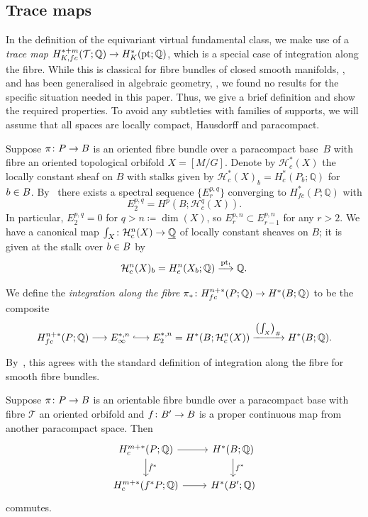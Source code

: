 \documentclass[AHL,Unicode,longabstracts]{cedram}
\newcommand{\sub}{\subset}
\newcommand{\cl}{\colon}
\newcommand{\lc}{\underline}
\newcommand{\bQ}{\mathbb{Q}}
\newcommand{\cH}{\mathcal{H}}
\newcommand{\cT}{\mathcal{T}}
\DeclareMathOperator{\Pt}{pt}
\newcommand{\xra}{\xrightarrow}
\renewcommand*{\to}{\mathchoice{\longrightarrow}{\rightarrow}{\rightarrow}{\rightarrow}}
\newcommand{\longhookrightarrow}{\lhook\joinrel\longrightarrow}
\newcommand*{\hookto}{\mathchoice{\longhookrightarrow}{\hookrightarrow}{\hookrightarrow}{\hookrightarrow}}
\let\oldin\in
\renewcommand{\in}{\mathchoice{\oldin}{\oldin}{\,\oldin\,}{\,\oldin\,}}
\let\oldtilde\tilde
\renewcommand*{\tilde}[1]{\mathchoice{\widetilde{#1}}{\widetilde{#1}}{\oldtilde{#1}}{\oldtilde{#1}}}
\begin{document}
\subsection{Trace maps}\label{subsec:trace}
In the definition of the equivariant virtual fundamental class, we make use of a \emph{trace map} $H^{*+m}_{K,fc}(\cT;\bQ)\to H^*_K(\Pt;\bQ)$, which is a special case of integration along the fibre. While this is classical for fibre bundles of closed smooth manifolds, \cite{BT82}, and has been generalised in algebraic geometry, \cite{Iv86,KS94}, we found no results for the specific situation needed in this paper. Thus, we give a brief definition and show the required properties. To avoid any subtleties with families of supports, we will assume that all spaces are locally compact, Hausdorff and paracompact.

\begin{defi} Suppose $\pi \cl P \to B$ is an oriented fibre bundle over a paracompact base~$B$ with fibre an oriented topological orbifold $X = [M/G]$. Denote by $\cH^*_c(X)$ the locally constant sheaf on $B$ with stalks given by $\cH^*_c(X)_b = H^*_c(P_b;\bQ)$ for $b \in B$. By~\cite[Theorem~6.1]{Bre12} there exists a spectral sequence $\{E^{p,q}_r\}$ converging to $H^*_{fc}(P;\bQ)$ with
\[
E^{p,q}_2 = H^p\left(B;\cH^q_c(X)\right).
\]
In particular, $E^{p,q}_2 = 0$ for $q > n\coloneqq \dim(X)$, so $E^{p,n}_r \sub E^{p,n}_{r-1}$ for any $r > 2$. We have a canonical map $\int_X \cl\cH^n_c(X)\to \lc{\bQ}$ of locally constant sheaves on $B$; it is given at the stalk over $b \in B$ by
\[
\cH^n_c(X)_b =
H^n_c(X_b;\bQ)\overset{\Pt_!}{\to} \bQ.
\]

We define the \emph{integration along the fibre} $\pi_*\cl H^{n+*}_{fc}(P;\bQ)\to H^*(B;\bQ)$ to be the composite
\[
H^{n+*}_{fc}(P;\bQ) \to E^{*,n}_\infty \hookto E^{*,n}_2 = H^*(B;\cH^n_c(X)) \xra{\left(\int_X\right)_\#} H^*(B;\bQ).
\]
\end{defi}

By~\cite{Au73}, this agrees with the standard definition of integration along the fibre for smooth fibre bundles.

\begin{lemm}\label{lem:trace-base-change}
Suppose $\pi \cl P \to B$ is an orientable fibre bundle over a paracompact base with fibre $\cT$ an oriented orbifold and $f \cl B'\to B$ is a proper continuous map from another paracompact space. Then
\[
\begin{tikzcd}
H^{m+*}_{c}(P;\bQ)\arrow[r,] \arrow[d,"\tilde{f}^*"] & H^*(B;\bQ)\arrow[d,"f^*"]\\
H^{m+*}_{c}(f^*P;\bQ) \arrow[r,]& H^*(B';\bQ)
\end{tikzcd}
\]
commutes.
\end{lemm}
\end{document}

